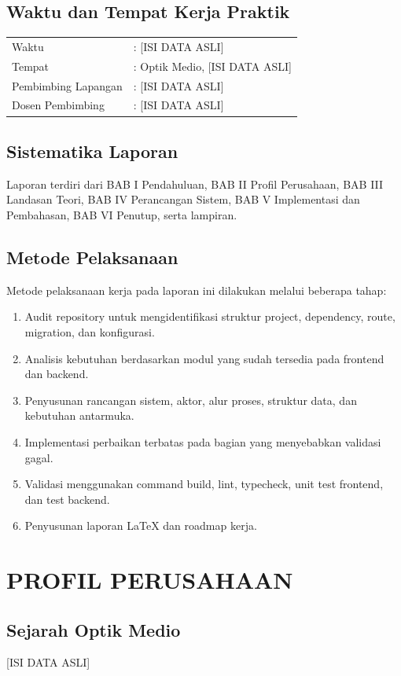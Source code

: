 \documentclass[12pt,a4paper]{report}
\begin{document}
\section{Waktu dan Tempat Kerja Praktik}
\begin{tabular}{ll}
Waktu & : [ISI DATA ASLI] \\
Tempat & : Optik Medio, [ISI DATA ASLI] \\
Pembimbing Lapangan & : [ISI DATA ASLI] \\
Dosen Pembimbing & : [ISI DATA ASLI] \\
\end{tabular}

\section{Sistematika Laporan}
Laporan terdiri dari BAB I Pendahuluan, BAB II Profil Perusahaan, BAB III Landasan Teori, BAB IV Perancangan Sistem, BAB V Implementasi dan Pembahasan, BAB VI Penutup, serta lampiran.

\section{Metode Pelaksanaan}
Metode pelaksanaan kerja pada laporan ini dilakukan melalui beberapa tahap:
\begin{enumerate}
    \item Audit repository untuk mengidentifikasi struktur project, dependency, route, migration, dan konfigurasi.
    \item Analisis kebutuhan berdasarkan modul yang sudah tersedia pada frontend dan backend.
    \item Penyusunan rancangan sistem, aktor, alur proses, struktur data, dan kebutuhan antarmuka.
    \item Implementasi perbaikan terbatas pada bagian yang menyebabkan validasi gagal.
    \item Validasi menggunakan command build, lint, typecheck, unit test frontend, dan test backend.
    \item Penyusunan laporan LaTeX dan roadmap kerja.
\end{enumerate}

\chapter{PROFIL PERUSAHAAN}
\section{Sejarah Optik Medio}
[ISI DATA ASLI]
\end{document}
